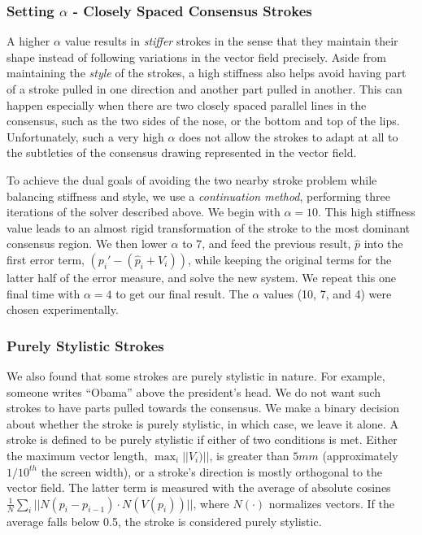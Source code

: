 \subsubsection{Setting $\alpha$ - Closely Spaced Consensus Strokes}

A higher $\alpha$ value results in {\em stiffer} strokes in the sense that they maintain their shape instead of following variations in the vector field precisely. Aside from maintaining the {\em style} of the strokes, a high stiffness also helps avoid having part of a stroke pulled in one direction and another part pulled in another. This can happen especially when there are two closely spaced parallel lines in the consensus, such as the two sides of the nose, or the bottom and top of the lips. Unfortunately, such a very high $\alpha$ does not allow the strokes to adapt at all to the subtleties of the consensus drawing represented in the vector field.

To achieve the dual goals of avoiding the two nearby stroke problem while balancing stiffness and style, we use a {\em continuation method}, performing three iterations of the solver described above. We begin with $\alpha=10$. This high stiffness value leads to an almost rigid transformation of the stroke to the most dominant consensus region. We then lower $\alpha$ to 7, and feed the previous result, $\hat{p}$ into the first error term, $(p_i' - (\hat{p}_i + V_i))$, while keeping the original terms for the latter half of the error measure, and solve the new system. We repeat this one final time with $\alpha=4$ to get our final result. The $\alpha$ values (10, 7, and 4) were chosen experimentally.

\subsubsection{Purely Stylistic Strokes}

We also found that some strokes are purely stylistic in nature. For example, someone writes ``Obama'' above the president's head. We do not want such strokes to have parts pulled towards the consensus. We make a binary decision about whether the stroke is purely stylistic, in which case, we leave it alone. A stroke is defined to be purely stylistic if either of two conditions is met. Either the maximum vector length, $\max_i||V_i)||$, is greater than $5mm$ (approximately $1/10^{th}$ the screen width), or a stroke's direction is mostly orthogonal to the vector field. The latter term is measured with the average of absolute cosines $\frac{1}{N}\sum_i||N(p_i - p_{i-1}) \cdot N(V(p_i))||\textrm{,}$ where $N(\cdot)$ normalizes vectors. If the average falls below 0.5, the stroke is considered purely stylistic.





